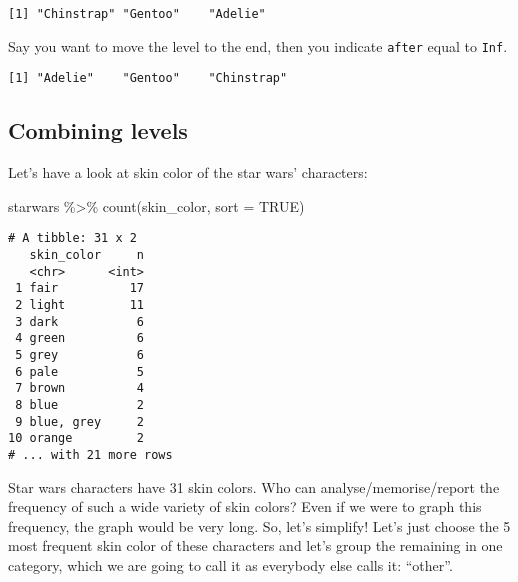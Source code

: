 \documentclass[
]{article}
\newenvironment{Shaded}{\begin{snugshade}}{\end{snugshade}}
\newcommand{\AttributeTok}[1]{\textcolor[rgb]{0.77,0.63,0.00}{#1}}
\newcommand{\ConstantTok}[1]{\textcolor[rgb]{0.00,0.00,0.00}{#1}}
\newcommand{\FunctionTok}[1]{\textcolor[rgb]{0.00,0.00,0.00}{#1}}
\newcommand{\NormalTok}[1]{#1}
\newcommand{\SpecialCharTok}[1]{\textcolor[rgb]{0.00,0.00,0.00}{#1}}
\newcommand{\StringTok}[1]{\textcolor[rgb]{0.31,0.60,0.02}{#1}}
\begin{document}
\begin{verbatim}
[1] "Chinstrap" "Gentoo"    "Adelie"   
\end{verbatim}

Say you want to move the level to the end, then you indicate
\texttt{after} equal to \texttt{Inf}.

\begin{Shaded}
\end{Shaded}

\begin{verbatim}
[1] "Adelie"    "Gentoo"    "Chinstrap"
\end{verbatim}

\hypertarget{combining-levels}{%
\subsection{Combining levels}\label{combining-levels}}

Let's have a look at skin color of the star wars' characters:

\begin{Shaded}
\begin{Highlighting}[]
\NormalTok{starwars }\SpecialCharTok{\%\textgreater{}\%}
  \FunctionTok{count}\NormalTok{(skin\_color, }\AttributeTok{sort =} \ConstantTok{TRUE}\NormalTok{)}
\end{Highlighting}
\end{Shaded}

\begin{verbatim}
# A tibble: 31 x 2
   skin_color     n
   <chr>      <int>
 1 fair          17
 2 light         11
 3 dark           6
 4 green          6
 5 grey           6
 6 pale           5
 7 brown          4
 8 blue           2
 9 blue, grey     2
10 orange         2
# ... with 21 more rows
\end{verbatim}

Star wars characters have 31 skin colors. Who can
analyse/memorise/report the frequency of such a wide variety of skin
colors? Even if we were to graph this frequency, the graph would be very
long. So, let's simplify! Let's just choose the 5 most frequent skin
color of these characters and let's group the remaining in one category,
which we are going to call it as everybody else calls it: ``other''.
\end{document}
